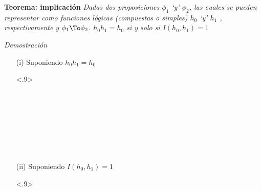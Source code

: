 \begin{proofbox}[10]{\textbf{Teorema: implicación}}
    \emph{
        Dadas dos proposiciones $\phi_1$ `y' $\phi_2$, las cuales se pueden representar como funciones lógicas (compuestas o simples) $h_0$ `y' $h_1$ , respectivamente y $\phi_1 \To \phi_2$. $h_0h_1 = h_0$ si y solo si $I(h_0, h_1) = 1$
    }
\end{proofbox}
\begin{subproofbox}[10]{\emph{Demostración}}
    \begin{itemize}
        \item[(i)] Suponiendo $h_0h_1 = h_0$
        
        \begin{center}
            \begin{derivation}<.9>
                    \\
                \why*[=]{}\\
                    \\
                \why*[=]{}\\
                    \\
                \\
                    \\
                \why*[=]{}\\
            \end{derivation}
        \end{center}

        \item[(ii)] Suponiendo $I(h_0, h_1) = 1$
        
        \begin{center}
            \begin{derivation}<.9>
                    \\
                \why*{}\\
                    \\
                \why*{}\\
                    \\
                \why*{}\\
            \end{derivation}
        \end{center}

    \end{itemize}
\end{subproofbox}
